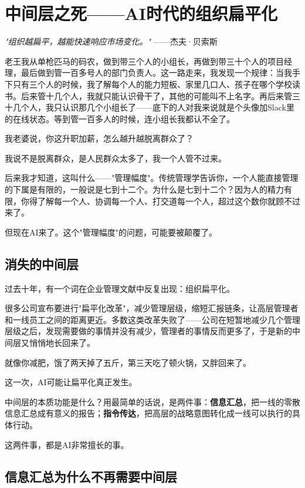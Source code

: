 \chapter{中间层之死——AI时代的组织扁平化}


\textit{"组织越扁平，越能快速响应市场变化。"}
——杰夫·贝索斯


老王我从单枪匹马的码农，做到带三个人的小组长，再做到带三十个人的项目经理，最后做到管一百多号人的部门负责人。这一路走来，我发现一个规律：当我手下只有三个人的时候，我了解每个人的能力短板、家里几口人、孩子在哪个学校读书。后来管十几个人，我就只能认识骨干了，其他的可能叫不上名字。再后来管三十几个人，我只认识那几个小组长了——底下的人对我来说就是个头像加Slack里的在线状态。等到管一百多人的时候，连小组长我都认不全了。

我老婆说，你这升职加薪，怎么越升越脱离群众了？

我说不是脱离群众，是人民群众太多了，我一个人管不过来。

后来我才知道，这叫什么——"管理幅度"。传统管理学告诉你，一个人能直接管理的下属是有限的，一般说是七到十二个。为什么是七到十二个？因为人的精力有限，你得了解每一个人、协调每一个人、打交道每一个人，超过这个数你就顾不过来了。

但现在AI来了。这个"管理幅度"的问题，可能要被颠覆了。

\section{消失的中间层}


过去十年，有一个词在企业管理文献中反复出现：组织扁平化。

很多公司宣布要进行"扁平化改革"，减少管理层级，缩短汇报链条，让高层管理者和一线员工之间的距离更近。多数这类改革失败了——公司在短暂地减少几个管理层级之后，发现需要做的事情并没有减少，管理者的事情反而更多了，于是新的中间层又悄悄地长回来了。

就像你减肥，饿了两天掉了五斤，第三天吃了顿火锅，又胖回来了。

这一次，AI可能让扁平化真正发生。

中间层的本质功能是什么？用最简单的话说，是两件事：\textbf{信息汇总}，把一线的零散信息汇总成有意义的报告；\textbf{指令传达}，把高层的战略意图转化成一线可以执行的具体行动。

这两件事，都是AI非常擅长的事。

\section{信息汇总为什么不再需要中间层}


